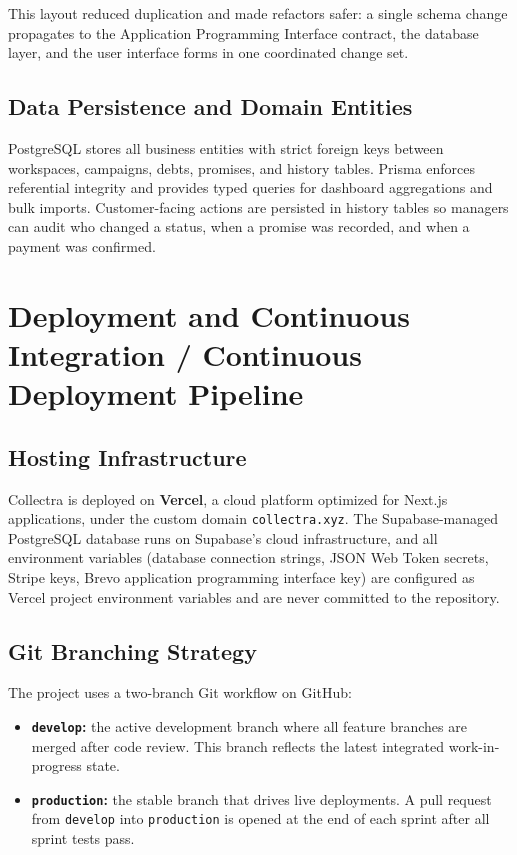 ﻿\documentclass[12pt,a4paper]{report}
\begin{document}
This layout reduced duplication and made refactors safer: a single schema change propagates to
the Application Programming Interface contract, the database layer, and the user interface forms
in one coordinated change set.

\subsection{Data Persistence and Domain Entities}

PostgreSQL stores all business entities with strict foreign keys between workspaces, campaigns,
debts, promises, and history tables.
Prisma enforces referential integrity and provides typed queries for dashboard aggregations and
bulk imports.
Customer-facing actions are persisted in history tables so managers can audit who changed a
status, when a promise was recorded, and when a payment was confirmed.

\section{Deployment and Continuous Integration / Continuous Deployment Pipeline}
\label{sec:deployment}

\subsection{Hosting Infrastructure}

Collectra is deployed on \textbf{Vercel}, a cloud platform optimized for Next.js
applications, under the custom domain \texttt{collectra.xyz}.
The Supabase-managed PostgreSQL database runs on Supabase's cloud infrastructure,
and all environment variables (database connection strings, JSON Web Token secrets, Stripe keys,
Brevo application programming interface key) are configured as Vercel project environment variables and are never
committed to the repository.

\subsection{Git Branching Strategy}

The project uses a two-branch Git workflow on GitHub:

\begin{itemize}
  \item \textbf{\texttt{develop}:} the active development branch where all feature
        branches are merged after code review. This branch reflects the latest
        integrated work-in-progress state.
  \item \textbf{\texttt{production}:} the stable branch that drives live deployments.
        A pull request from \texttt{develop} into \texttt{production} is opened at
        the end of each sprint after all sprint tests pass.
\end{itemize}
\end{document}
